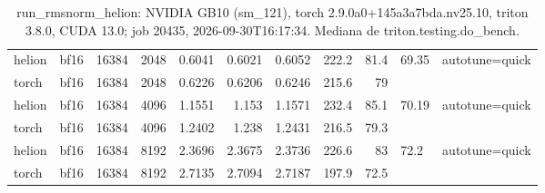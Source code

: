 \begin{table}[htbp]
\begin{tabular}{llrrrrrrrll}
    helion & bf16 & 16384 & 2048 & 0.6041 & 0.6021 & 0.6052 & 222.2 & 81.4 & 69.35 & autotune=quick \\
    torch & bf16 & 16384 & 2048 & 0.6226 & 0.6206 & 0.6246 & 215.6 & 79 &  &  \\
    helion & bf16 & 16384 & 4096 & 1.1551 & 1.153 & 1.1571 & 232.4 & 85.1 & 70.19 & autotune=quick \\
    torch & bf16 & 16384 & 4096 & 1.2402 & 1.238 & 1.2431 & 216.5 & 79.3 &  &  \\
    helion & bf16 & 16384 & 8192 & 2.3696 & 2.3675 & 2.3736 & 226.6 & 83 & 72.2 & autotune=quick \\
    torch & bf16 & 16384 & 8192 & 2.7135 & 2.7094 & 2.7187 & 197.9 & 72.5 &  &  \\
    \bottomrule
  \end{tabular}
  \caption{run\_rmsnorm\_helion: NVIDIA GB10 (sm\_121), torch 2.9.0a0+145a3a7bda.nv25.10, triton 3.8.0, CUDA 13.0; job 20435, 2026-09-30T16:17:34. Mediana de triton.testing.do\_bench.}
  \label{tab:run-rmsnorm-helion}
\end{table}
